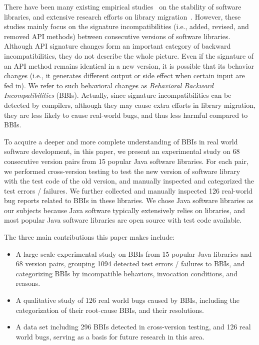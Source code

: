 There have been many existing empirical studies~\cite{Raemaekers:APIStability,McDonnell:APIStability} on the stability of software libraries, and extensive research efforts on library migration~\cite{Dagenais:ICSE08,Wu:ICSE10}. However, these studies mainly focus on the signature incompatibilities (i.e., added, revised, and removed API methods) between consecutive versions of software libraries. Although API signature changes form an important category of backward incompatibilities, they do not describe the whole picture. Even if the signature of an API method remains identical in a new version, it is possible that its behavior changes (i.e., it generates different output or side effect when certain input are fed in). We refer to such behavioral changes as \textit{Behavioral Backward Incompatibilities} (BBIs). Actually, since signature incompatibilities can be detected by compilers, although they may cause extra efforts in library migration, they are less likely to cause real-world bugs, and thus less harmful compared to BBIs. 

To acquire a deeper and more complete understanding of BBIs in real world software development, in this paper, we present an experimental study on 68 consecutive version pairs from 15 popular Java software libraries. For each pair, we performed cross-version testing to test the new version of software library with the test code of the old version, and manually inspected and categorized the test errors / failures. We further collected and manually inspected 126 real-world bug reports related to BBIs in these libraries. We chose Java software libraries as our subjects because Java software typically extensively relies on libraries, and most popular Java software libraries are open source with test code available. 

The three main contributions this paper makes include:

\begin{itemize}
	
	\item A large scale experimental study on BBIs from 15 popular Java libraries and 68 version pairs, grouping 1094 detected test errors / failures to BBIs, and categorizing BBIs by incompatible behaviors, invocation conditions, and reasons.	

	\item A qualitative study of 126 real world bugs caused by BBIs, including the categorization of their root-cause BBIs, and their resolutions. 

	\item A data set including 296 BBIs detected in cross-version testing, and 126 real world bugs, serving as a basis for future research in this area. 
\end{itemize}

